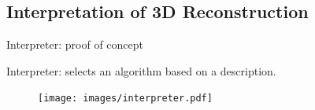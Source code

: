 \documentclass[10pt]{beamer}
\begin{document}
\subsection{Interpretation of 3D Reconstruction}
\begin{frame}{Interpreter: proof of concept}

Interpreter: selects an algorithm based on a description.

\begin{figure}[!htbp]
\centering
\texttt{[image: images/interpreter.pdf]}
\end{figure}

\end{frame}

\end{document}
